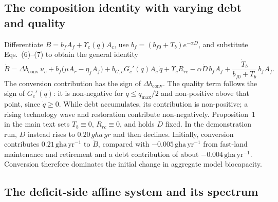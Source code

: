 \documentclass[11pt,a4paper]{article}
\newcommand{\dconv}{\Delta b_{\mathrm{conv}}}
\newcommand{\Ups}{\Upsilon_c}
\begin{document}
\subsection{The composition identity with varying debt and quality}\label{si:identity}

Differentiate $B=b_fA_f+\Ups(q)A_c$, use $b_f=(b_{f0}+T_b)e^{-\alpha D}$, and substitute Eqs.~(6)--(7) to obtain the general identity
\begin{equation}\label{eq:si_identity}
\dot B=\dconv\,u_c+b_f\big(\mu A_r-\eta_fA_f\big)+b_{G,c}G_c'(q)A_c\,\dot q+\Ups R_{rc}-\alpha\dot D\,b_fA_f+\frac{\dot T_b}{b_{f0}+T_b}\,b_fA_f .
\end{equation}
The conversion contribution has the sign of $\dconv$. The quality term follows the sign of $G_c'(q)$: it is non-negative for $q\le q_{\max}/2$ and non-positive above that point, since $\dot q\ge0$. While debt accumulates, its contribution is non-positive; a rising technology wave and restoration contribute non-negatively. Proposition~1 in the main text sets $T_b\equiv0$, $R_{rc}\equiv0$, and holds $D$ fixed. In the demonstration run, $D$ instead rises to $0.20\,gha\,yr$ and then declines. Initially, conversion contributes $0.21\,\mathrm{gha\,yr^{-1}}$ to $\dot B$, compared with $-0.005\,\mathrm{gha\,yr^{-1}}$ from fast-land maintenance and retirement and a debt contribution of about $-0.004\,\mathrm{gha\,yr^{-1}}$. Conversion therefore dominates the initial change in aggregate model biocapacity.

\newpage
\subsection{The deficit-side affine system and its spectrum}\label{si:affine}
\end{document}
